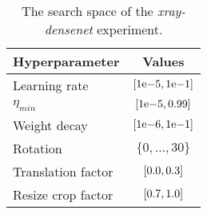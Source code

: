 \begin{table}
    \centering
    \begin{tabular}{lc}
        \toprule
        Hyperparameter & Values \\
        \midrule
        Learning rate & $\interval{1\mathrm{e}{-5}}{1\mathrm{e}{-1}}$ \\
        $\eta_{min}$ & $\interval{1\mathrm{e}{-5}}{0.99}$ \\
        Weight decay & $\interval{1\mathrm{e}{-6}}{1\mathrm{e}{-1}}$ \\
        Rotation & $\{0, \ldots , 30\}$ \\
        Translation factor & $\interval{0.0}{0.3}$ \\
        Resize crop factor & $\interval{0.7}{1.0}$ \\
        \bottomrule
    \end{tabular}
    \caption{The search space of the \textit{xray-densenet} experiment.}
    \label{tab:xray_densenet}
\end{table}



